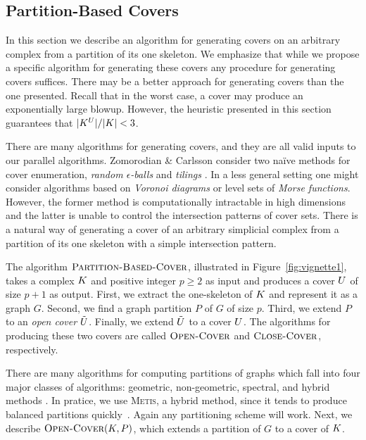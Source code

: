 \documentclass{jocg}
\begin{document}
\subsection{Partition-Based Covers}
\label{sec:partition-based-covers}
\label{sec:pcover}

In this section we describe an algorithm for generating covers on an 
arbitrary complex from a partition of its one skeleton. We emphasize that while we propose a specific
algorithm for generating these covers any procedure for generating covers suffices. 
There may be a better approach for generating covers than the one presented. Recall that in the worst case,
a cover may produce an exponentially large blowup. However, the heuristic presented in this section guarantees that $|K^{U}|/|K| < 3$. 

There are many algorithms for generating covers, and they are all valid inputs to our parallel algorithms. 
Zomorodian \& Carlsson consider two na\"ive methods for cover enumeration, \emph{random $\epsilon$-balls} 
and \emph{tilings} \cite{zc-lh-08}. In a less general setting one might consider
algorithms based on \emph{Voronoi diagrams} or level sets of 
\emph{Morse functions}. However, the former method is
computationally intractable in high dimensions and 
the latter is unable to control the intersection patterns of cover sets. 
There is a natural way of generating a cover of an arbitrary simplicial complex from a 
partition of its one skeleton with a simple intersection pattern. 

The algorithm $\textnormal{\scshape Partition-Based-Cover}$, illustrated in Figure~\ref{fig:vignette1}, takes a complex $K$ and positive 
integer $p \geq 2$ as input and produces a cover $U$ of size $p+1$ as output. 
First, we extract the one-skeleton of $K$ and represent it as a graph $G$. 
Second, we find a graph partition $P$ of $G$ of size $p$.  
Third, we extend $P$ to an \emph{open cover} $\tilde{U}$. Finally, we extend $\tilde{U}$ to a cover $U$. The algorithms
for producing these two covers are called $\textnormal{\scshape Open-Cover}$ and
$\textnormal{\scshape Close-Cover}$, respectively. 

There are many algorithms for computing partitions of graphs which
fall into four major classes of algorithms: geometric, non-geometric, 
spectral, and hybrid methods \cite{fj-gp-98}. In pratice, we use \textsc{Metis}, 
a hybrid method, since it tends to produce balanced partitions quickly~\cite{KaKu95}. Again
any partitioning scheme will work. 
Next, we describe $\textnormal{\scshape Open-Cover}(K,P)$, which extends a partition of $G$ to a cover of $K$. 
\end{document}
